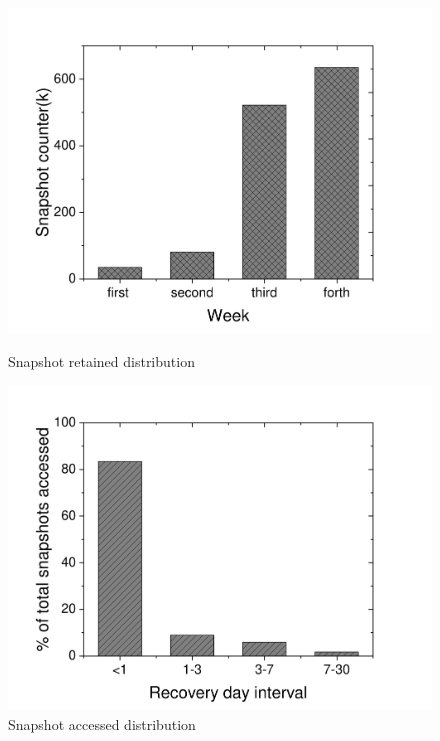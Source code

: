 \documentclass[sigconf, nonacm]{acmart}
\begin{document}
\begin{figure}[htbp]
	\begin{minipage}[t]{0.48\linewidth}
		\includegraphics[width=\linewidth]{figures/ceph_pic/ali_counter_workload.pdf} 
		\caption{Snapshot retained distribution} 
		\label{fig:retained_distribution}
	\end{minipage}
	\hfill%
	\begin{minipage}[t]{0.48\linewidth}
		\includegraphics[width=\linewidth]{figures/ceph_pic/ali_percentage_workload.pdf}
		\caption{Snapshot accessed distribution}
		\label{fig:accessed_distribution}
	\end{minipage} 
\end{figure}
\end{document}
